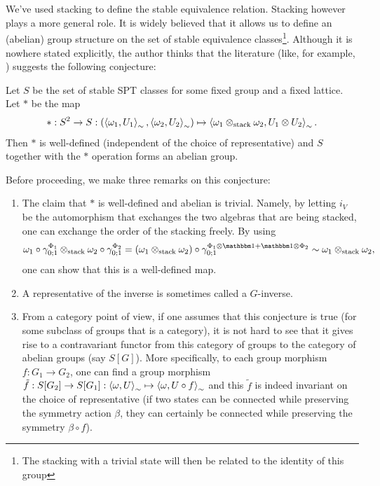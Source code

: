 \documentclass[11pt,a4paper,twoside]{article}
\numberwithin{equation}{section}
\begin{document}
	\\\\
	We've used stacking to define the stable equivalence relation. Stacking however plays a more general role. It is widely believed that it allows us to define an (abelian) group structure on the set of stable equivalence classes\footnote{The stacking with a trivial state will then be related to the identity of this group}. Although it is nowhere stated explicitly, the author thinks that the literature (like, for example, \cite{kapustin2021classification}) suggests the following conjecture:
	\begin{conjecture}\label{conj:StableEquivGroupStructure}
		Let $S$ be the set of stable SPT classes for some fixed group and a fixed lattice. Let $*$ be the map
		\begin{equation}
			*:S^2\rightarrow S:(\expval{\omega_1,U_1}_{\sim},\expval{\omega_2,U_2}_{\sim})\mapsto \expval{\omega_1\otimes_\text{stack}\omega_2,U_1\otimes U_2}_{\sim}.
		\end{equation}
		Then $*$ is well-defined (independent of the choice of representative) and $S$ together with the $*$ operation forms an abelian group.
	\end{conjecture}
	Before proceeding, we make three remarks on this conjecture:
	\begin{enumerate}
		\item The claim that $*$ is well-defined and abelian is trivial. Namely, by letting $i_V$ be the automorphism that exchanges the two algebras that are being stacked, one can exchange the order of the stacking freely. By using
		\begin{equation}
			\omega_1\circ\gamma^{\Phi_1}_{0;1}\otimes_\text{stack}\omega_2\circ\gamma^{\Phi_2}_{0;1}=(\omega_1\otimes_{\text{stack}}\omega_2)\circ\gamma^{\Phi_1\otimes\id+\id\otimes\Phi_2}_{0;1}\sim\omega_1\otimes_{\text{stack}}\omega_2,
		\end{equation}
		one can show that this is a well-defined map.
		\item A representative of the inverse is sometimes called a $G$-inverse.
		\item From a category point of view, if one assumes that this conjecture is true (for some subclass of groups that is a category), it is not hard to see that it gives rise to a contravariant functor from this category of groups to the category of abelian groups (say $S[G]$). More specifically, to each group morphism $f:G_1\rightarrow G_2$, one can find a group morphism $\tilde{f}:S[G_2]\rightarrow S[G_1]:\expval{\omega,U}_\sim\mapsto \expval{\omega,U\circ f}_\sim$ and this $\tilde{f}$ is indeed invariant on the choice of representative (if two states can be connected while preserving the symmetry action $\beta$, they can certainly be connected while preserving the symmetry $\beta\circ f$).
	\end{enumerate}
\end{document}
